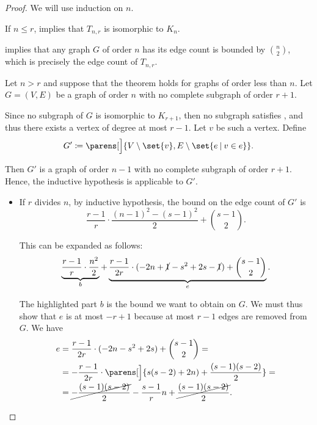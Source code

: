 \begin{proof}
  We will use induction on \( n \).

   If \( n \leq r \),  implies that \( T_{n,r} \) is isomorphic to \( K_n \).

   implies that any graph \( G \) of order \( n \) has its edge count is bounded by \( \binom n 2 \), which is precisely the edge count of \( T_{n,r} \).

   Let \( n > r \) and suppose that the theorem holds for graphs of order less than \( n \). Let \( G = (V, E) \) be a graph of order \( n \) with no complete subgraph of order \( r + 1 \).

  Since no subgraph of \( G \) is isomorphic to \( K_{r+1} \), then no subgraph satisfies , and thus there exists a vertex of degree at most \( r - 1 \). Let \( v \) be such a vertex. Define
  \begin{equation*}
    G' \coloneqq \parens[\Big]{ V \setminus \set{ v }, E \setminus \set{ e \given v \in e } }.
  \end{equation*}

  Then \( G' \) is a graph of order \( n - 1 \) with no complete subgraph of order \( r + 1 \). Hence, the inductive hypothesis is applicable to \( G' \).
  \begin{itemize}
    \item If \( r \) divides \( n \), by inductive hypothesis, the bound on the edge count of \( G' \) is
    \begin{equation*}
      \frac {r - 1} r \cdot \frac {(n - 1)^2 - (s - 1)^2} 2 + \binom {s - 1} 2.
    \end{equation*}

    This can be expanded as follows:
    \begin{equation*}
      \underbrace{\frac {r - 1} r \cdot \frac {n^2} 2}_b + \underbrace{\frac {r - 1} {2r} \cdot (-2n + \cancel{1} - s^2 + 2s - \cancel{1}) + \binom {s - 1} 2}_e.
    \end{equation*}

    The highlighted part \( b \) is the bound we want to obtain on \( G \). We must thus show that \( e \) is at most \( -r + 1 \) because at most \( r - 1 \) edges are removed from \( G \). We have
    \begin{align*}
      e
      &=
      \frac {r - 1} {2r} \cdot (-2n - s^2 + 2s) + \binom {s - 1} 2
      = \\ &=
      -\frac {r - 1} {2r} \cdot \parens[\Big]{ s(s - 2) + 2n ) + \frac {(s - 1)(s - 2)} 2 }
      = \\ &=
      \cancel{-\frac {(s - 1)(s - 2)} 2} - \frac {s - 1} r n + \cancel{\frac {(s - 1)(s - 2)} 2}.
    \end{align*}


\end{itemize}
\end{proof}
